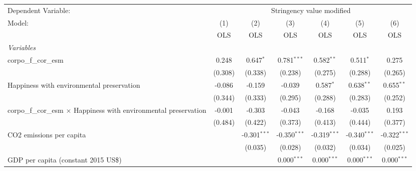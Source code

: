 
\begingroup
\centering
\begin{tabular}{lcccccc}
   \toprule
   Dependent Variable: & \multicolumn{6}{c}{Stringency value modified}\\
   Model:                                                                    & (1)     & (2)            & (3)            & (4)            & (5)            & (6)\\  
                                                                             &  OLS    & OLS            & OLS            & OLS            & OLS            & OLS\\  
   \midrule
   \emph{Variables}\\
   corpo\_f\_cor\_esm                                                        & 0.248   & 0.647$^{*}$    & 0.781$^{***}$  & 0.582$^{**}$   & 0.511$^{*}$    & 0.275\\   
                                                                             & (0.308) & (0.338)        & (0.238)        & (0.275)        & (0.288)        & (0.265)\\   
   Happiness with environmental preservation                                 & -0.086  & -0.159         & -0.039         & 0.587$^{*}$    & 0.638$^{**}$   & 0.655$^{**}$\\   
                                                                             & (0.344) & (0.333)        & (0.295)        & (0.288)        & (0.283)        & (0.252)\\   
   corpo\_f\_cor\_esm $\times$ Happiness with environmental preservation     & -0.001  & -0.303         & -0.043         & -0.168         & -0.035         & 0.193\\   
                                                                             & (0.484) & (0.422)        & (0.373)        & (0.413)        & (0.444)        & (0.377)\\   
   CO2 emissions per capita                                                  &         & -0.301$^{***}$ & -0.350$^{***}$ & -0.319$^{***}$ & -0.340$^{***}$ & -0.322$^{***}$\\   
                                                                             &         & (0.035)        & (0.028)        & (0.032)        & (0.034)        & (0.025)\\   
   GDP per capita (constant 2015 US\$)                                       &         &                & 0.000$^{***}$  & 0.000$^{***}$  & 0.000$^{***}$  & 0.000$^{***}$\\   

\end{tabular}
